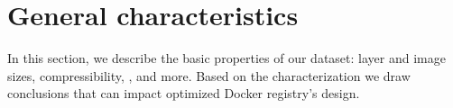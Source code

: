 \section{General characteristics}
\label{sec:char}

In this section, we describe the basic properties of our dataset: layer and
image sizes, compressibility, , and more.
%
Based on the characterization we draw conclusions that can impact optimized
Docker registry's design.




